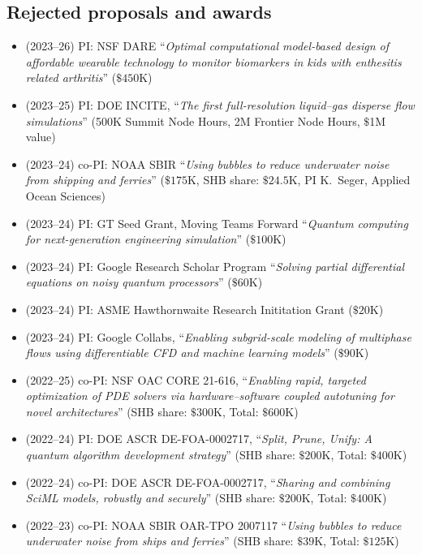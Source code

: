 \subsection{Rejected proposals and awards}

\begin{itemize}
    \item (2023--26) PI: NSF DARE ``\textit{Optimal computational model-based design of affordable wearable technology to monitor biomarkers in kids with enthesitis related arthritis}'' ($\$450$K)
    \item (2023--25) PI: DOE INCITE, ``\textit{The first full-resolution liquid--gas disperse flow simulations}'' (500K Summit Node Hours, 2M Frontier Node Hours, $\$$1M value)
    \item (2023--24) co-PI: NOAA SBIR ``\textit{Using bubbles to reduce underwater noise from shipping and ferries}'' ($\$175$K, SHB share: $\$24.5$K, PI K.\ Seger, Applied Ocean Sciences)
    \item (2023--24) PI: GT Seed Grant, Moving Teams Forward ``\textit{Quantum computing for next-generation engineering simulation}'' ($\$100$K)
    \item (2023--24) PI: Google Research Scholar Program ``\textit{Solving partial differential equations on noisy quantum processors}'' ($\$60$K)
    \item (2023--24) PI: ASME Hawthornwaite Research Inititation Grant ($\$20$K)
    \item (2023--24) PI: Google Collabs, ``\textit{Enabling subgrid-scale modeling of multiphase flows using differentiable CFD and machine learning models}'' ($\$90$K)
    \item (2022--25) co-PI: NSF OAC CORE 21-616, ``\textit{Enabling rapid, targeted optimization of PDE solvers via hardware--software coupled autotuning for novel architectures}'' (SHB share: $\$300$K, Total: $\$600$K)
    \item (2022--24) PI: DOE ASCR DE-FOA-0002717, ``\textit{Split, Prune, Unify: A quantum algorithm development strategy}'' (SHB share: $\$200$K, Total: $\$400$K)
    \item (2022--24) co-PI: DOE ASCR DE-FOA-0002717, ``\textit{Sharing and combining SciML models, robustly and securely}'' (SHB share: $\$200$K, Total: $\$400$K)
    \item (2022--23) co-PI: NOAA SBIR OAR-TPO 2007117 ``\textit{Using bubbles to reduce underwater noise from ships and ferries}'' (SHB share: $\$39$K, Total: $\$125$K)
\end{itemize}
